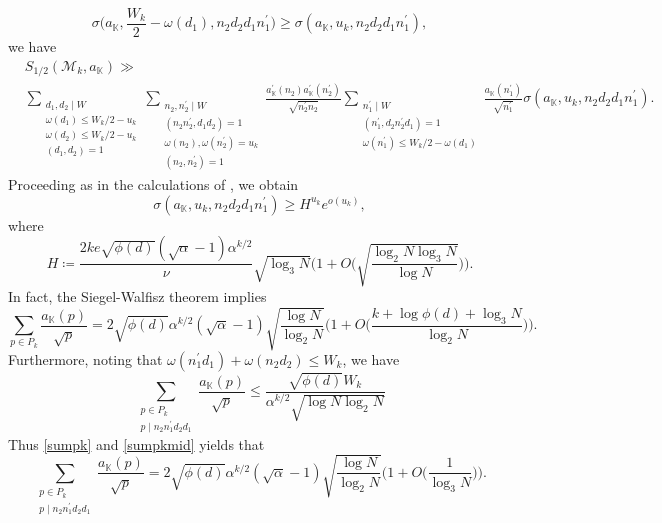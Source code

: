 \documentclass[12pt,reqno]{amsart}
\theoremstyle{definition}
\numberwithin{equation}{section}
\newcommand{\mbk}{\mathbb{K}}
\newcommand{\mcm}{\mathcal{M}}
\begin{document}
$$
\sigma\Big(a_\mbk, \frac{W_k}{2}-\omega\left(d_1\right), n_2 d_2 d_1 n_1^{\prime}\Big) \geq \sigma(a_\mbk, u_k, n_2 d_2 d_1 n_1^{\prime}),
$$
we have 
\begin{align*}
    & S_{1/2}(\mcm_k, a_\mbk) \gg \\
    & \sum_{\substack{d_1, d_2 \mid W \\ \omega(d_1) \le W_k / 2-u_k \\ \omega(d_2) \le W_k / 2-u_k\\(d_1, d_2)=1}} \sum_{\substack{n_2, n_2^{\prime} \mid W \\(n_2 n_2^{\prime}, d_1 d_2)=1 \\ \omega(n_2), \omega(n_2^{\prime})=u_k \\(n_2, n_2^{\prime})=1}} \frac{a_\mbk^{\prime}\left(n_2\right) a_\mbk^{\prime}\left(n_2^{\prime}\right)}{\sqrt{n_2^{\prime} n_2}} \sum_{\substack{n_1^{\prime} \mid W \\(n_1^{\prime}, d_2 n_2^{\prime} d_1)=1 \\ \omega(n_1^{\prime}) \le W_k / 2-\omega(d_1)}}\frac{a_\mbk(n_1^{\prime})}{\sqrt{n_1^{\prime}}} \sigma(a_\mbk, u_k, n_2 d_2 d_1 n_1^{\prime}).
\end{align*}
Proceeding as in the calculations of \cite[pp. 8-9]{tenen2019galsum}, we obtain 
\begin{equation}
    \label{Hupperbound}
    \sigma(a_\mbk, u_k, n_2 d_2 d_1 n_1^{\prime}) \ge H^{u_k}e^{o(u_k)},
\end{equation}
where 
$$
H \coloneqq \frac{2 k e\sqrt{\phi(d)}(\sqrt{\alpha}-1) \alpha^{k / 2}}{\nu} \sqrt{\log _3 N}\bigg(1+O\bigg(\sqrt{\frac{\log _2 N \log _3 N}{\log N}}\bigg)\bigg).
$$
In fact, the Siegel-Walfisz theorem implies 
\begin{equation}
    \label{sumpk}
    \sum_{p \in P_k} \frac{a_\mbk(p)}{\sqrt{p}} = 2\sqrt{\phi(d)}\alpha^{k/2}(\sqrt{\alpha}-1)\sqrt{\frac{\log N}{\log_2 N}}\Big(1+O\Big(\frac{k+\log\phi(d)+\log_3 N}{\log_2 N} \Big) \Big).
\end{equation}
Furthermore, noting that $\omega(n_1^\prime d_1)+\omega(n_2 d_2) \le W_k$, we have 
\begin{equation}
    \label{sumpkmid}
    \sum_{\substack{p \in P_k \\ p \mid n_2 n_1^\prime d_2 d_1}}\frac{a_\mbk(p)}{\sqrt{p}} \le \frac{\sqrt{\phi(d)}W_k}{\alpha^{k/2}\sqrt{\log N \log_2 N}} 
\end{equation} 
Thus \eqref{sumpk} and \eqref{sumpkmid} yields that
\begin{equation}
    \sum_{\substack{p \in P_k \\ p \mid n_2 n_1^\prime d_2 d_1}}\frac{a_\mbk(p)}{\sqrt{p}}  = 2\sqrt{\phi(d)}\alpha^{k/2}(\sqrt{\alpha}-1)\sqrt{\frac{\log N}{\log_2 N}}\Big(1+O\Big(\frac{1}{\log_3 N} \Big) \Big).
\end{equation}
\end{document}
